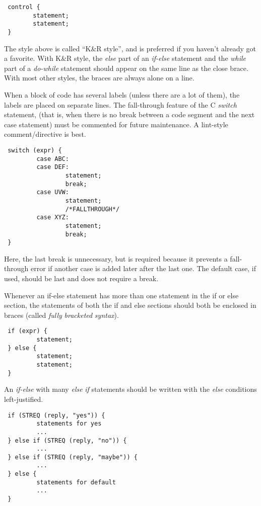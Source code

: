 \begin{verbatim}
 control {
        statement;
        statement;
 } 
\end{verbatim}

The style above is called ``K\&R style'', and is preferred if you haven't
already got a favorite. With K\&R style, the {\em else} part of an
{\em if-else} statement and the {\em while} part of a {\em do-while} statement
should appear on the same line as the close brace. With most other styles, the
braces are always alone on a line.

 When a block of code has several labels (unless there are a lot of them), the
labels are placed on separate lines. The fall-through feature of the C
{\em switch} statement, (that is, when there is no break between a code
segment and the next case statement) must be commented for future
maintenance. A lint-style comment/directive is best. 

\begin{verbatim}
 switch (expr) {
         case ABC:
         case DEF:
                 statement;
                 break;
         case UVW:
                 statement;
                 /*FALLTHROUGH*/
         case XYZ:
                 statement;
                 break;
 } 
\end{verbatim}

 Here, the last break is unnecessary, but is required because it prevents a
fall-through error if another case is added later after the last one. The
default case, if used, should be last and does not require a break. 

 Whenever an if-else statement has more than one statement in the if or else
section, the statements of both the if and else sections should both be
enclosed in braces (called {\em fully} {\em bracketed} {\em syntax}). 

\begin{verbatim}
 if (expr) {
         statement;
 } else {
         statement;
         statement;
 } 
\end{verbatim}

An {\em if-else} with many {\em else} {\em if} statements should be
written with the {\em else} conditions left-justified.

\begin{verbatim}
 if (STREQ (reply, "yes")) {
         statements for yes
         ...
 } else if (STREQ (reply, "no")) {
         ...
 } else if (STREQ (reply, "maybe")) {
         ...
 } else {  
         statements for default
         ...
 } 
\end{verbatim}

